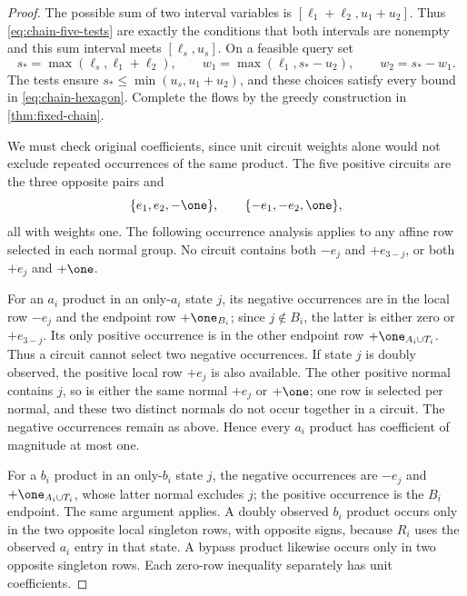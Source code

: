 \begin{proof}
The possible sum of two interval variables is
$[\ell_1+\ell_2,u_1+u_2]$. Thus \eqref{eq:chain-five-tests}
are exactly the conditions that both intervals are nonempty and
this sum interval meets $[\ell_s,u_s]$. On a feasible query set
\[
 s_* =\max(\ell_s,\ell_1+\ell_2),\qquad
 w_1=\max(\ell_1,s_*-u_2),\qquad w_2=s_*-w_1.
\]
The tests ensure $s_*\le\min(u_s,u_1+u_2)$, and these choices
satisfy every bound in \eqref{eq:chain-hexagon}. Complete the
flows by the greedy construction in \cref{thm:fixed-chain}.

We must check original coefficients, since unit circuit weights alone
would not exclude repeated occurrences of the same product. The five
positive circuits are the three opposite pairs and
\begin{equation}\label{eq:chain-five-circuits}
 \{e_1,e_2,-\one\},\qquad
 \{-e_1,-e_2,\one\},
\end{equation}
all with weights one. The following occurrence analysis applies to
any affine row selected in each normal group. No circuit contains
both $-e_j$ and $+e_{3-j}$, or both $+e_j$ and $+\one$.

For an $a_i$ product in an only-$a_i$ state $j$, its negative
occurrences are in the local row $-e_j$ and the endpoint row
$+\one_{B_i}$; since $j\notin B_i$, the latter is either zero
or $+e_{3-j}$. Its only positive occurrence is in the other endpoint
row $+\one_{A_i\cup T_i}$. Thus a circuit cannot select two
negative occurrences. If state $j$ is doubly observed, the positive
local row $+e_j$ is also available. The other positive normal
contains $j$, so is either the same normal $+e_j$ or $+\one$;
one row is selected per normal, and these two distinct normals do
not occur together in a circuit. The negative occurrences remain
as above. Hence every $a_i$ product has coefficient of magnitude
at most one.

For a $b_i$ product in an only-$b_i$ state $j$, the negative
occurrences are $-e_j$ and $+\one_{A_i\cup T_i}$, whose latter
normal excludes $j$; the positive occurrence is the $B_i$ endpoint.
The same argument applies. A doubly observed $b_i$ product occurs
only in the two opposite local singleton rows, with opposite signs,
because $R_i$ uses the observed $a_i$ entry in that state.
A bypass product likewise occurs only in two opposite singleton rows.
Each zero-row inequality separately has unit coefficients.


\end{proof}
